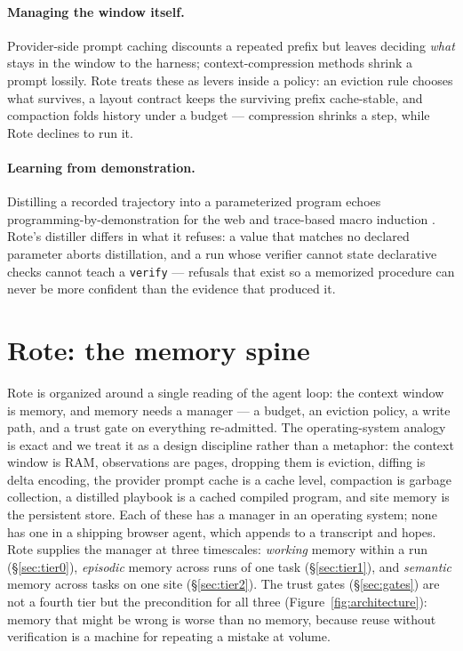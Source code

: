 \documentclass{article} %
\begin{document}
\paragraph{Managing the window itself.} Provider-side prompt caching
\citep{anthropic2024caching, openaicaching2024} discounts a repeated prefix but leaves
deciding \emph{what} stays in the window to the harness; context-compression methods
\citep{jiang2023llmlingua} shrink a prompt lossily. Rote treats these as levers inside a
policy: an eviction rule chooses what survives, a layout contract keeps the surviving
prefix cache-stable, and compaction folds history under a budget --- compression shrinks
a step, while Rote declines to run it.

\paragraph{Learning from demonstration.} Distilling a recorded trajectory into a
parameterized program echoes programming-by-demonstration for the web
\citep{leshed2008coscripter} and trace-based macro induction \citep{yeh2009sikuli}. Rote's
distiller differs in what it refuses: a value that matches no declared parameter aborts
distillation, and a run whose verifier cannot state declarative checks cannot teach a
\texttt{verify} --- refusals that exist so a memorized procedure can never be more
confident than the evidence that produced it.

\section{Rote: the memory spine}
\label{sec:design}

Rote is organized around a single reading of the agent loop: the context window is
memory, and memory needs a manager --- a budget, an eviction policy, a write path, and a
trust gate on everything re-admitted. The operating-system analogy is exact and we treat
it as a design discipline rather than a metaphor: the context window is RAM, observations
are pages, dropping them is eviction, diffing is delta encoding, the provider prompt
cache is a cache level, compaction is garbage collection, a distilled playbook is a
cached compiled program, and site memory is the persistent store. Each of these has a
manager in an operating system; none has one in a shipping browser agent, which appends
to a transcript and hopes. Rote supplies the manager at three timescales: \emph{working}
memory within a run (\S\ref{sec:tier0}), \emph{episodic} memory across runs of one task
(\S\ref{sec:tier1}), and \emph{semantic} memory across tasks on one site
(\S\ref{sec:tier2}). The trust gates (\S\ref{sec:gates}) are not a fourth tier but the
precondition for all three (Figure~\ref{fig:architecture}): memory that might be wrong is worse than no memory, because
reuse without verification is a machine for repeating a mistake at volume.
\end{document}
